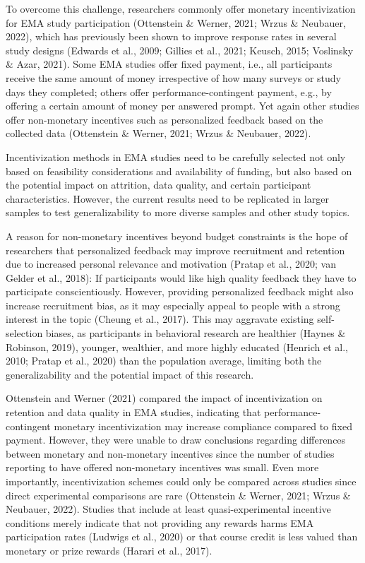 \documentclass[authordate, empirical,issue]{jote-new-article}
\begin{document}
	To overcome this challenge, researchers commonly offer monetary incentivization for EMA study participation (Ottenstein \& Werner, 2021; Wrzus \& Neubauer, 2022), which has previously been shown to improve response rates in several study designs (Edwards et al., 2009; Gillies et al., 2021; Keusch, 2015; Voslinsky \& Azar, 2021). Some EMA studies offer fixed payment, i.e., all participants receive the same amount of money irrespective of how many surveys or study days they completed; others offer performance-contingent payment, e.g., by offering a certain amount of money per answered prompt. Yet again other studies offer non-monetary incentives such as personalized feedback based on the collected data (Ottenstein \& Werner, 2021; Wrzus \& Neubauer, 2022).


	\begin{takeHomeMessage}
		Incentivization methods in EMA studies need to be carefully selected not only based on feasibility considerations and availability of funding, but also based on the potential impact on attrition, data quality, and certain participant characteristics. However, the current results need to be replicated in larger samples to test generalizability to more diverse samples and other study topics.
	
	\end{takeHomeMessage}

	A reason for non-monetary incentives beyond budget constraints is the hope of researchers that personalized feedback may improve recruitment and retention due to increased personal relevance and motivation (Pratap et al., 2020; van Gelder et al., 2018): If participants would like high quality feedback they have to participate conscientiously. However, providing personalized feedback might also increase recruitment bias, as it may especially appeal to people with a strong interest in the topic (Cheung et al., 2017). This may aggravate existing self-selection biases, as participants in behavioral research are healthier (Haynes \& Robinson, 2019), younger, wealthier, and more highly educated (Henrich et al., 2010; Pratap et al., 2020) than the population average, limiting both the generalizability and the potential impact of this research.



	Ottenstein and Werner (2021) compared the impact of incentivization on retention and data quality in EMA studies, indicating that performance-contingent monetary incentivization may increase compliance compared to fixed payment. However, they were unable to draw conclusions regarding differences between monetary and non-monetary incentives since the number of studies reporting to have offered non-monetary incentives was small. Even more importantly, incentivization schemes could only be compared across studies since direct experimental comparisons are rare (Ottenstein \& Werner, 2021; Wrzus \& Neubauer, 2022). Studies that include at least quasi-experimental incentive conditions merely indicate that not providing any rewards harms EMA participation rates (Ludwigs et al., 2020) or that course credit is less valued than monetary or prize rewards (Harari et al., 2017).
\end{document}
